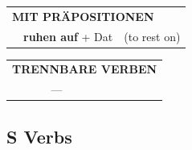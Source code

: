 \documentclass[10pt,a4paper]{revtex4-2}
\begin{document}
\begin{verbbox}
\vspace{10pt}

\begin{tabular}{lll}
\multicolumn{3}{l}{\textbf{MIT PRÄPOSITIONEN}}\\
& \textbf{ruhen auf} + Dat & (to rest on)\\
\end{tabular}
\hfill
\begin{tabular}{lll}
\multicolumn{3}{l}{\textbf{TRENNBARE VERBEN}}\\
& ---\\
\end{tabular}

\vspace{-5pt}
\end{verbbox}

\subsection{S Verbs}
\end{document}
